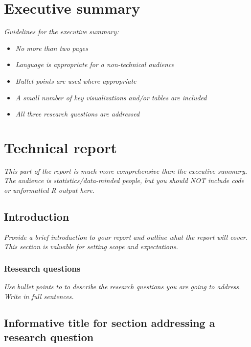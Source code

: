 \documentclass[
          english,
          paper=a4,
              ,captions=tableheading
  ]{scrartcl}
\providecommand{\tightlist}{%
        \setlength{\itemsep}{0pt}\setlength{\parskip}{0pt}}
\begin{document}
\newpage

\hypertarget{executive-summary}{%
\section{Executive summary}\label{executive-summary}}

\emph{Guidelines for the executive summary:}

\begin{itemize}
\tightlist
\item
  \emph{No more than two pages}
\item
  \emph{Language is appropriate for a non-technical audience}
\item
  \emph{Bullet points are used where appropriate}
\item
  \emph{A small number of key visualizations and/or tables are included}
\item
  \emph{All three research questions are addressed}
\end{itemize}

\newpage

\hypertarget{technical-report}{%
\section{Technical report}\label{technical-report}}

\emph{This part of the report is much more comprehensive than the
executive summary. The audience is statistics/data-minded people, but
you should NOT include code or unformatted R output here.}

\hypertarget{introduction}{%
\subsection{Introduction}\label{introduction}}

\emph{Provide a brief introduction to your report and outline what the
report will cover. This section is valuable for setting scope and
expectations. }

\hypertarget{research-questions}{%
\subsubsection{Research questions}\label{research-questions}}

\emph{Use bullet points to to describe the research questions you are
going to address. Write in full sentences.}

\hypertarget{informative-title-for-section-addressing-a-research-question}{%
\subsection{Informative title for section addressing a research
question}\label{informative-title-for-section-addressing-a-research-question}}
\end{document}
